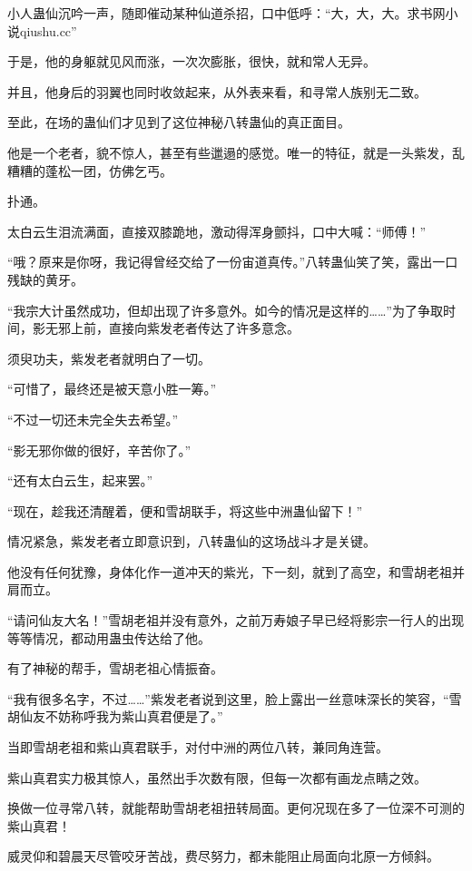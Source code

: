 
\begin{this_body}

小人蛊仙沉吟一声，随即催动某种仙道杀招，口中低呼：“大，大，大。求书网小说qiushu.cc”

于是，他的身躯就见风而涨，一次次膨胀，很快，就和常人无异。

并且，他身后的羽翼也同时收敛起来，从外表来看，和寻常人族别无二致。

至此，在场的蛊仙们才见到了这位神秘八转蛊仙的真正面目。

他是一个老者，貌不惊人，甚至有些邋遢的感觉。唯一的特征，就是一头紫发，乱糟糟的蓬松一团，仿佛乞丐。

扑通。

太白云生泪流满面，直接双膝跪地，激动得浑身颤抖，口中大喊：“师傅！”

“哦？原来是你呀，我记得曾经交给了一份宙道真传。”八转蛊仙笑了笑，露出一口残缺的黄牙。

“我宗大计虽然成功，但却出现了许多意外。如今的情况是这样的……”为了争取时间，影无邪上前，直接向紫发老者传达了许多意念。

须臾功夫，紫发老者就明白了一切。

“可惜了，最终还是被天意小胜一筹。”

“不过一切还未完全失去希望。”

“影无邪你做的很好，辛苦你了。”

“还有太白云生，起来罢。”

“现在，趁我还清醒着，便和雪胡联手，将这些中洲蛊仙留下！”

情况紧急，紫发老者立即意识到，八转蛊仙的这场战斗才是关键。

他没有任何犹豫，身体化作一道冲天的紫光，下一刻，就到了高空，和雪胡老祖并肩而立。

“请问仙友大名！”雪胡老祖并没有意外，之前万寿娘子早已经将影宗一行人的出现等等情况，都动用蛊虫传达给了他。

有了神秘的帮手，雪胡老祖心情振奋。

“我有很多名字，不过……”紫发老者说到这里，脸上露出一丝意味深长的笑容，“雪胡仙友不妨称呼我为紫山真君便是了。”

当即雪胡老祖和紫山真君联手，对付中洲的两位八转，兼同角连营。

紫山真君实力极其惊人，虽然出手次数有限，但每一次都有画龙点睛之效。

换做一位寻常八转，就能帮助雪胡老祖扭转局面。更何况现在多了一位深不可测的紫山真君！

威灵仰和碧晨天尽管咬牙苦战，费尽努力，都未能阻止局面向北原一方倾斜。


\end{this_body}
